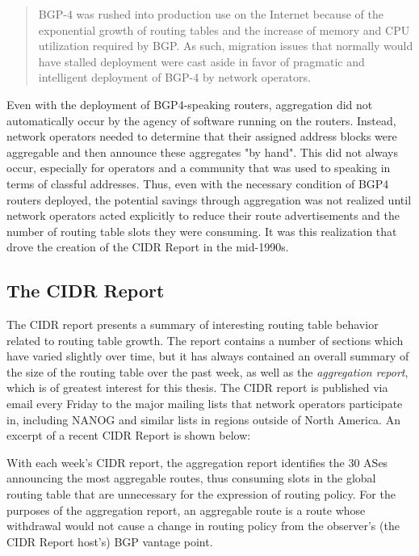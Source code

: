 \begin{quote}
BGP-4 was rushed into production use on the Internet because of the exponential growth of routing tables and the increase of memory and CPU utilization required by BGP.  As such, migration issues that normally would have stalled deployment were cast aside in favor of pragmatic and intelligent deployment of BGP-4 by network operators.
\end{quote}

Even with the deployment of BGP4-speaking routers, aggregation did not automatically occur by the agency of software running on the routers. Instead, network operators needed to determine that their assigned address blocks were aggregable and then announce these aggregates "by hand". This did not always occur, especially for operators and a community that was used to speaking in terms of classful addresses. Thus, even with the necessary condition of BGP4 routers deployed, the potential savings through aggregation was not realized until network operators acted explicitly to reduce their route advertisements and the number of routing table slots they were consuming. It was this realization that drove the creation of the CIDR Report in the mid-1990s.

\subsection{The CIDR Report}

The CIDR report presents a summary of interesting routing table behavior related to routing table growth. The report contains a number of sections which have varied slightly over time, but it has always contained an overall summary of the size of the routing table over the past week, as well as the \emph{aggregation report}, which is of greatest interest for this thesis. The CIDR report is published via email every Friday to the major mailing lists that network operators participate in, including NANOG and similar lists in regions outside of North America. An excerpt of a recent CIDR Report is shown below:


With each week's CIDR report, the aggregation report identifies the 30 ASes announcing the most aggregable routes, thus consuming slots in the global routing table that are unnecessary for the expression of routing policy. For the purposes of the aggregation report, an aggregable route is a route whose withdrawal would not cause a change in routing policy from the observer's (the CIDR Report host's) BGP vantage point.

